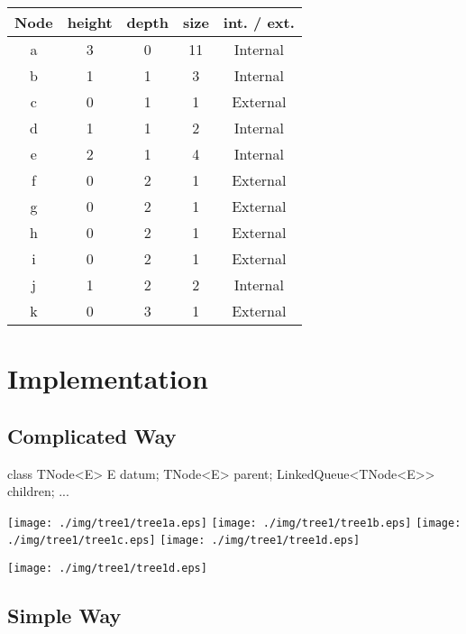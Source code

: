 \documentclass[a4paper, 9pt]{extarticle}
\begin{document}
\begin{center}
  \begin{tabular}{|c|c|c|c|c|}
    \hline
    Node & height & depth & size & int. / ext. \\
    \hline
    a & 3 & 0 & 11 & Internal \\
    b & 1 & 1 & 3  & Internal \\
    c & 0 & 1 & 1  & External \\
    \hline
    d & 1 & 1 & 2 & Internal \\
    e & 2 & 1 & 4 & Internal \\
    f & 0 & 2 & 1 & External \\
    \hline
    g & 0 & 2 & 1 & External \\
    h & 0 & 2 & 1 & External \\
    i & 0 & 2 & 1 & External \\
    \hline
    j & 1 & 2 & 2 & Internal \\
    k & 0 & 3 & 1 & External \\
    \hline
  \end{tabular}
\end{center}



\newpage

\section{Implementation}


\subsection{Complicated Way}

\begin{blackboard}
class TNode<E> {
    E datum;
    TNode<E> parent;
    LinkedQueue<TNode<E>> children;
    ...
}
\end{blackboard}

\texttt{[image: ./img/tree1/tree1a.eps]}
\texttt{[image: ./img/tree1/tree1b.eps]}
\texttt{[image: ./img/tree1/tree1c.eps]}
\texttt{[image: ./img/tree1/tree1d.eps]}

\begin{center}
\texttt{[image: ./img/tree1/tree1d.eps]}
\end{center}



\newpage

\subsection{Simple Way}
\end{document}

